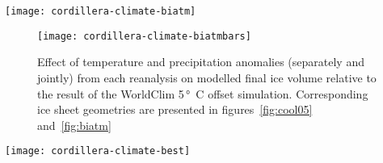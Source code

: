 \begin{figure*}[t]
	\vspace*{2mm}
	\begin{center}
		\texttt{[image: cordillera-climate-biatm]}
	\end{center}
	\caption{Ice surface topography (1 km contours) and velocity (\unit{m\,a^{-1}}) after 10\,ka using “hybrid” climate forcing with precipitation rate from WorldClim and surface air temperature from each reanalysis (upper row), and surface air temperature from WorldClim and precipitation rate from each reanalysis (lower row). In other words, the upper row shows the effect of temperature anomalies, and the lower row the effect of precipitation anomalies, for each reanalysis, relative to WorldClim data. Each simulation uses a 5\,\unit{\degree C} offset for comparison with figure~\ref{fig:cool05}}
	\label{fig:biatm}
\end{figure*}

\begin{figure}[t]
	\vspace*{2mm}
	\begin{center}
		\texttt{[image: cordillera-climate-biatmbars]}
	\end{center}
	\caption{Effect of temperature and precipitation anomalies (separately and jointly) from each reanalysis on modelled final ice volume relative to the result of the WorldClim 5\,\unit{\degree C} offset simulation. Corresponding ice sheet geometries are presented in figures~\ref{fig:cool05} and~\ref{fig:biatm}}
	\label{fig:biatmbars}
\end{figure}

\begin{figure*}[t]
	\vspace*{2mm}
	\begin{center}
		\texttt{[image: cordillera-climate-best]}
	\end{center}
	\caption{Ice surface topography (1\,km contours) after 10\,ka using temperature offsets resulting in glaciated areas of circa $2\,\times10^6\,\unit{km^2}$. A reconstructed LGM ice sheet margin by \citet{dyke-2004} (Fig.~\ref{fig:locmap}) is given for reference (blue line).}
	\label{fig:best}
\end{figure*}

